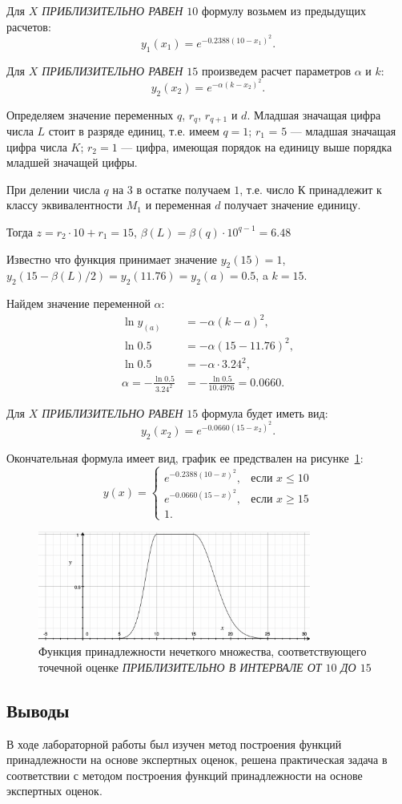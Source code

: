 Для \textit{$X$ ПРИБЛИЗИТЕЛЬНО РАВЕН $10$} формулу возьмем из предыдущих расчетов: 
\[
	y_1(x_1) = e^{-0.2388(10 - x_1)^2}.
\]

Для \textit{$X$ ПРИБЛИЗИТЕЛЬНО РАВЕН $15$} произведем расчет параметров $\alpha$ и $k$: 
\[
	y_2(x_2) = e^{-\alpha(k - x_2)^2}.
\]

Определяем значение переменных $q$, $r_q$, $r_{q+1}$ и $d$. Младшая значащая цифра числа $L$ стоит в разряде единиц, т.е. имеем $q=1$; $r_1$ = $5$ --- младшая значащая цифра числа $K$; $r_2 = 1$ --- цифра, имеющая порядок на единицу выше порядка младшей значащей цифры.

При делении числа $q$ на $3$ в остатке получаем $1$, т.е. число $К$ принадлежит к классу эквивалентности $M_1$ и переменная $d$ получает значение единицу. 

Тогда $z=r_2 \cdot 10 + r_1=15$, $\beta(L) = \beta(q)\cdot 10^{q-1} = 6.48$

Известно что функция принимает значение $y_2(15)=1$, $y_2(15-\beta(L)/2)=y_2(11.76)=y_2(a)=0.5$, a $k = 15$.

Найдем значение переменной $\alpha$:
\begin{align*}
	\ln y_(a) &= -\alpha(k - a)^2, \\
	\ln 0.5 &= -\alpha(15 - 11.76)^2, \\
	\ln 0.5 &= -\alpha \cdot 3.24^2, \\
	\alpha = - \frac{\ln 0.5}{3.24^2} &= - \frac{\ln 0.5}{10.4976} = 0.0660.
\end{align*}

Для \textit{$X$ ПРИБЛИЗИТЕЛЬНО РАВЕН $15$} формула будет иметь вид: 
\[
	y_2(x_2) = e^{-0.0660(15 - x_2)^2}.
\]

Окончательная формула имеет вид, график ее предствален на рисунке~\ref{fig:graph2}:
\[
	y(x) = 
	\begin{cases} 
		e^{-0.2388(10 - x)^2}, & \mbox{если } x \leq 10 \\ 
		e^{-0.0660(15 - x)^2}, & \mbox{если } x \geq 15 \\
		1.
	\end{cases}
\]

\begin{figure}[H]
	\centering
	  \includegraphics[width=0.8\textwidth]{graph2}
	\caption{Функция принадлежности нечеткого множества, соответствующего точечной оценке \textit{ПРИБЛИЗИТЕЛЬНО В ИНТЕРВАЛЕ ОТ $10$ ДО $15$}}
	\label{fig:graph2}
  \end{figure}

\subsection{Выводы}

В ходе лабораторной работы был изучен метод построения функций принадлежности на основе экспертных оценок, решена практическая задача в соответствии с методом построения функций принадлежности на основе экспертных оценок.


